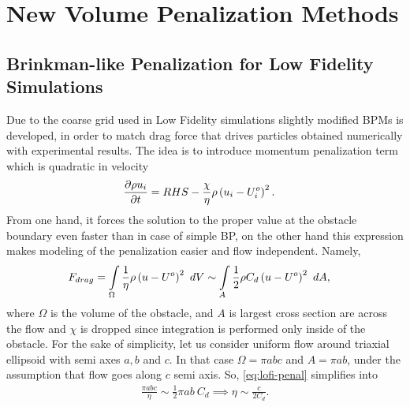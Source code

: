 \chapter{New Volume Penalization Methods}
\label{chapter:3}
\section{Brinkman-like Penalization for Low Fidelity Simulations}
Due to the coarse grid used in Low Fidelity simulations slightly modified BPMs is developed, in order to match drag force that drives particles obtained numerically with experimental results. The idea is to introduce momentum penalization term which is quadratic in velocity
\begin{align}
\frac {\partial \rho u_i}{\partial t} &= RHS - \frac \chi \eta \rho \left(u_i - U_i^o\right)^2. \label{eq:lofi-penal}
\end{align}
From one hand, it forces the solution to the proper value at the obstacle boundary even faster than in case of simple BP, on the other hand this expression makes modeling of the penalization easier and flow independent. Namely, 
\begin{align}
F_{drag} &= \int\displaylimits_\Omega \frac 1 \eta \rho \rbr{u - U^o}^2\ dV \sim \int \displaylimits_A \frac 12 \rho C_d \rbr{u - U^o}^2\ dA, \label{eq:lofi-penal}
\end{align}
where $\Omega$ is the volume of the obstacle, and $A$ is largest cross section are across the flow and $\chi$ is dropped since integration is performed only inside of the obstacle. For the sake of simplicity, let us consider uniform flow around triaxial ellipsoid with semi axes $a,b$ and $c$. In that case $\Omega = \pi a b c$ and $A = \pi a b$, under the assumption that flow goes along $c$ semi axis. So, \eqref{eq:lofi-penal} simplifies into
\begin{align}
\frac {\pi a b c}\eta \sim \frac 12 \pi a b\ C_d \implies \eta \sim \frac c{2C_d}.
\end{align}

